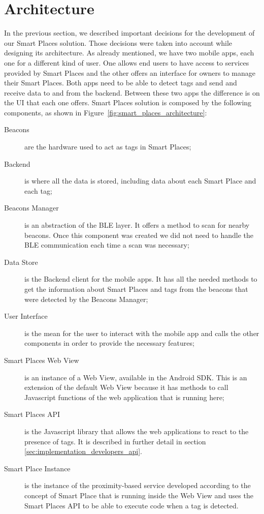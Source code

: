 \section{Architecture}
\label{sec:soltion_architecture}
In the previous section, we described important decisions for the development of our Smart Places solution. Those decisions were taken into account while designing its architecture.
As already mentioned, we have two mobile apps, each one for a different kind of user.
One allows end users to have access to services provided by Smart Places and the other offers an interface for owners to manage their Smart Places.
Both apps need to be able to detect tags and send and receive data to and from the backend.
Between these two apps the difference is on the \gls{UI} that each one offers.
Smart Places solution is composed by the following components, as shown in Figure~\ref{fig:smart_places_architecture}:
\begin{description}
  \item[Beacons]
  are the hardware used to act as tags in Smart Places;
  \item[Backend]
  is where all the data is stored, including data about each Smart Place and each tag;
  \item[Beacons Manager]
  is an abstraction of the \gls{BLE} layer.
  It offers a method to scan for nearby beacons. Once this component was created we did not need to handle the \gls{BLE} communication each time a scan was necessary;
  \item[Data Store]
  is the Backend client for the mobile apps.
  It has all the needed methods to get the information about Smart Places and tags from the beacons that were detected by the Beacons Manager;
  \item[User Interface]
  is the mean for the user to interact with the mobile app and calls the other components in order to provide the necessary features;
  \item[Smart Places Web View]
  is an instance of a Web View, available in the Android \gls{SDK}.
  This is an extension of the default Web View because it has methods to call Javascript functions of the web application that is running here;
  \item[Smart Places \gls{API}]
  is the Javascript library that allows the web applications to react to the presence of tags.
  It is described in further detail in section \ref{sec:implementation_developers_api}.
  \item[Smart Place Instance]
  is the instance of the proximity-based service developed according to the concept of Smart Place that is running inside the Web View and uses the Smart Places \gls{API} to be able to execute code when a tag is detected.
\end{description}

